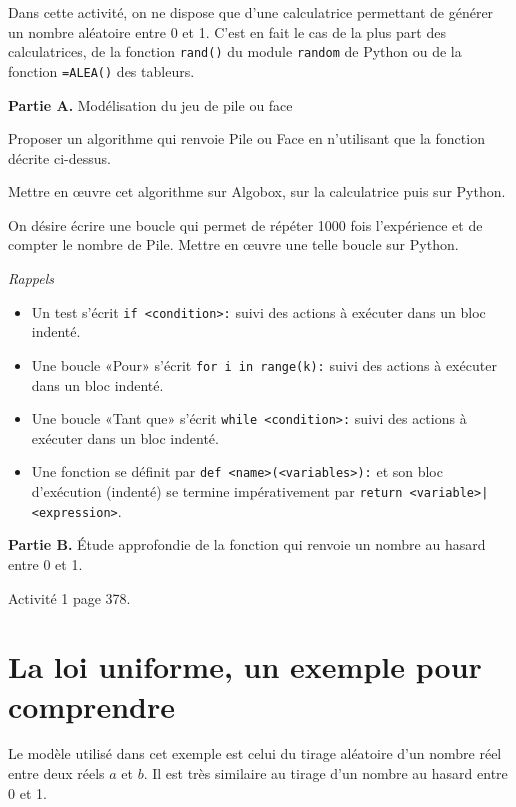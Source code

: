 \documentclass[11pt,a4paper,french]{article}
\makeatletter
\renewcommand{\maketitle}%
{\framebox{%
    \begin{minipage}{1.0\linewidth}%
      \begin{center}%
        \Large \@title ~-- \@author \\%
        \@date%
      \end{center}%
    \end{minipage}}%
  \normalsize%
}
\theoremstyle{break}
\theoremstyle{plain}
\theoremstyle{nonumberplain}
\theoremstyle{nonumberbreak}
\makeatother
\begin{document}
Dans cette activité, on ne dispose que d'une calculatrice permettant de
générer un nombre aléatoire entre 0 et 1. C'est en fait le cas de la
plus part des calculatrices, de la fonction \texttt{rand()} du module
\texttt{random} de Python ou de la fonction \texttt{=ALEA()} des
tableurs.

\textbf{Partie A.} Modélisation du jeu de pile ou face

Proposer un algorithme qui renvoie Pile ou Face en n'utilisant que la
fonction décrite ci-dessus.

Mettre en œuvre cet algorithme sur Algobox, sur la calculatrice puis sur
Python.

On désire écrire une boucle qui permet de répéter 1000 fois l'expérience
et de compter le nombre de Pile. Mettre en œuvre une telle boucle sur
Python.

\emph{Rappels}
\begin{itemize}
  \item Un test s'écrit \texttt{if <condition>:} suivi des actions à
    exécuter dans un bloc indenté.
  \item Une boucle «Pour» s'écrit \texttt{for i in range(k):} suivi des
    actions à exécuter dans un bloc indenté.
  \item Une boucle «Tant que» s'écrit \texttt{while <condition>:} suivi
    des actions à exécuter dans un bloc indenté.
  \item Une fonction se définit par \texttt{def <name>(<variables>):} et
    son bloc d'exécution (indenté) se termine impérativement par
    \texttt{return <variable>|<expression>}.
\end{itemize}

\textbf{Partie B.} Étude approfondie de la fonction qui renvoie un
nombre au hasard entre 0 et 1.

Activité 1 page 378.

\pagebreak
\setcounter{page}{1}

\noindent\maketitle

\bigskip

\section{La loi uniforme, un exemple pour comprendre}

Le modèle utilisé dans cet exemple est celui du tirage aléatoire d'un
nombre réel entre deux réels $a$ et $b$. Il est très similaire au tirage
d'un nombre au hasard entre 0 et 1.
\end{document}
